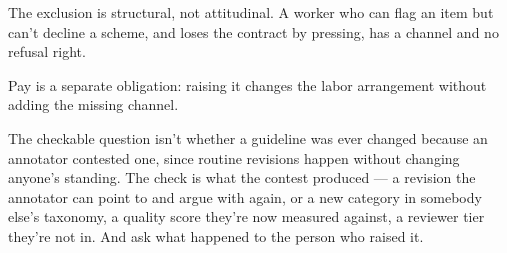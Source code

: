 
The exclusion is structural, not attitudinal.
A worker who can flag an item but can't decline a scheme, and loses the contract by pressing, has a channel and no refusal right.

Pay is a separate obligation: raising it changes the labor arrangement without adding the missing channel.

The checkable question isn't whether a guideline was ever changed because an annotator contested one, since routine revisions happen without changing anyone's standing. The check is what the contest produced — a revision the annotator can point to and argue with again, or a new category in somebody else's taxonomy, a quality score they're now measured against, a reviewer tier they're not in. And ask what happened to the person who raised it.
